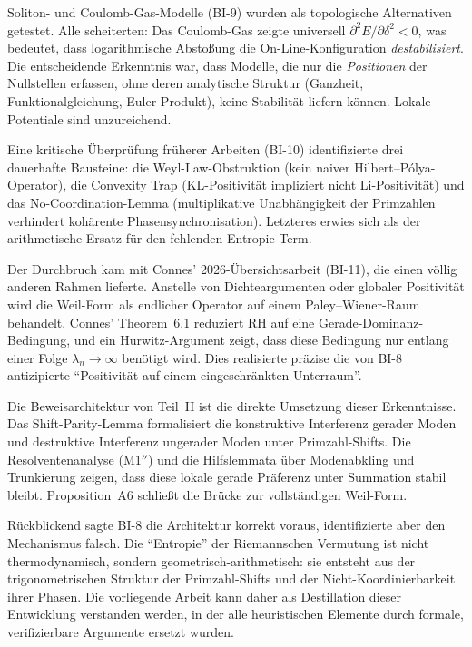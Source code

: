 \documentclass[12pt,a4paper]{article}
\theoremstyle{definition}
\theoremstyle{remark}
\begin{document}
Soliton- und Coulomb-Gas-Modelle (BI-9) wurden als topologische Alternativen getestet. Alle scheiterten: Das Coulomb-Gas zeigte universell $\partial^2 E/\partial\delta^2 < 0$, was bedeutet, dass logarithmische Abstoßung die On-Line-Konfiguration \emph{destabilisiert}. Die entscheidende Erkenntnis war, dass Modelle, die nur die \emph{Positionen} der Nullstellen erfassen, ohne deren analytische Struktur (Ganzheit, Funktionalgleichung, Euler-Produkt), keine Stabilität liefern können. Lokale Potentiale sind unzureichend.

Eine kritische Überprüfung früherer Arbeiten (BI-10) identifizierte drei dauerhafte Bausteine: die Weyl-Law-Obstruktion (kein naiver Hilbert--P\'olya-Operator), die Convexity Trap (KL-Positivität impliziert nicht Li-Positivität) und das No-Coordination-Lemma (multiplikative Unabhängigkeit der Primzahlen verhindert kohärente Phasensynchronisation). Letzteres erwies sich als der arithmetische Ersatz für den fehlenden Entropie-Term.

Der Durchbruch kam mit Connes' 2026-Übersichtsarbeit \cite{Connes2025} (BI-11), die einen völlig anderen Rahmen lieferte. Anstelle von Dichteargumenten oder globaler Positivität wird die Weil-Form als endlicher Operator auf einem Paley--Wiener-Raum behandelt. Connes' Theorem~6.1 reduziert RH auf eine Gerade-Dominanz-Bedingung, und ein Hurwitz-Argument zeigt, dass diese Bedingung nur entlang einer Folge $\lambda_n \to \infty$ benötigt wird. Dies realisierte präzise die von BI-8 antizipierte ``Positivität auf einem eingeschränkten Unterraum''.

Die Beweisarchitektur von Teil~II ist die direkte Umsetzung dieser Erkenntnisse. Das Shift-Parity-Lemma formalisiert die konstruktive Interferenz gerader Moden und destruktive Interferenz ungerader Moden unter Primzahl-Shifts. Die Resolventenanalyse (M1$''$) und die Hilfslemmata über Modenabkling und Trunkierung zeigen, dass diese lokale gerade Präferenz unter Summation stabil bleibt. Proposition~A6 schließt die Brücke zur vollständigen Weil-Form.

Rückblickend sagte BI-8 die Architektur korrekt voraus, identifizierte aber den Mechanismus falsch. Die ``Entropie'' der Riemannschen Vermutung ist nicht thermodynamisch, sondern geometrisch-arithmetisch: sie entsteht aus der trigonometrischen Struktur der Primzahl-Shifts und der Nicht-Koordinierbarkeit ihrer Phasen. Die vorliegende Arbeit kann daher als Destillation dieser Entwicklung verstanden werden, in der alle heuristischen Elemente durch formale, verifizierbare Argumente ersetzt wurden.
\end{document}
